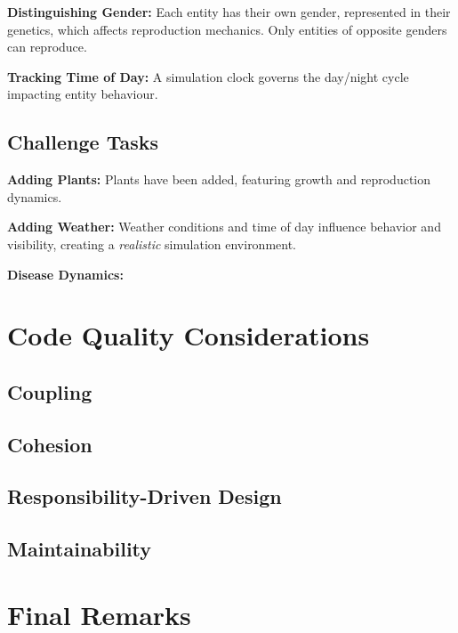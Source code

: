 \documentclass[12pt, a4paper]{scrartcl}
\begin{document}
\begin{multicols}{2}
  \noindent \textbf{Distinguishing Gender:} Each entity has their own gender, represented in their genetics,
  which affects reproduction mechanics. Only entities of opposite genders can reproduce.
  
  \noindent \textbf{Tracking Time of Day:} A simulation clock governs the day/night cycle impacting entity behaviour.

\subsection{Challenge Tasks}

  \noindent \textbf{Adding Plants:} Plants have been added, featuring growth and reproduction dynamics.
  
  \noindent \textbf{Adding Weather:} Weather conditions and time of day influence behavior and visibility,
  creating a \textit{realistic} simulation environment.
  
  \noindent \textbf{Disease Dynamics:} 

\section{Code Quality Considerations}

\subsection{Coupling}


\subsection{Cohesion}


\subsection{Responsibility-Driven Design}


\subsection{Maintainability}


\section{Final Remarks}


\end{multicols}
\end{document}
